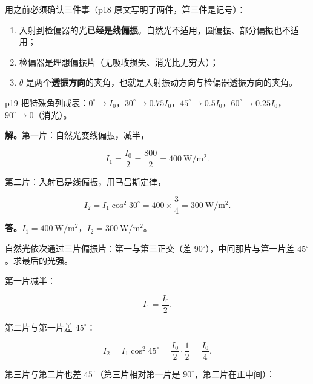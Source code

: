 \documentclass[11pt]{ctexart}
\let\subhdrtheme\subhdr
\renewcommand{\subhdr}[1]{\needspace{4\baselineskip}\subhdrtheme{#1}}
\begin{document}
用之前必须确认三件事（p18 原文写明了两件，第三件是记号）：

\begin{enumerate}
\item 入射到检偏器的光\textbf{已经是线偏振}。自然光不适用，圆偏振、部分偏振也不适用；
\item 检偏器是理想偏振片（无吸收损失、消光比无穷大）；
\item $\theta$ 是两个\textbf{透振方向}的夹角，也就是入射振动方向与检偏器透振方向的夹角。
\end{enumerate}

p19 把特殊角列成表：$0^\circ\to I_0$，$30^\circ\to0.75I_0$，$45^\circ\to0.5I_0$，$60^\circ\to0.25I_0$，$90^\circ\to0$（消光）。



\qbreak
{}

\textbf{解。}第一片：自然光变线偏振，减半，

\[
I_1=\frac{I_0}{2}=\frac{800}{2}=400\ \mathrm{W/m^2}.
\]

第二片：入射已是线偏振，用马吕斯定律，

\[
I_2=I_1\cos^2 30^\circ=400\times\frac34=300\ \mathrm{W/m^2}.
\]

\textbf{答。}$I_1=400\ \mathrm{W/m^2}$，$I_2=300\ \mathrm{W/m^2}$。



自然光依次通过三片偏振片：第一与第三正交（差 $90^\circ$），中间那片与第一片差 $45^\circ$。求最后的光强。

第一片减半：

\[
I_1=\frac{I_0}{2}.
\]

第二片与第一片差 $45^\circ$：

\[
I_2=I_1\cos^2 45^\circ=\frac{I_0}{2}\cdot\frac12=\frac{I_0}{4}.
\]

第三片与第二片也差 $45^\circ$（第三片相对第一片是 $90^\circ$，第二片在正中间）：
\end{document}
